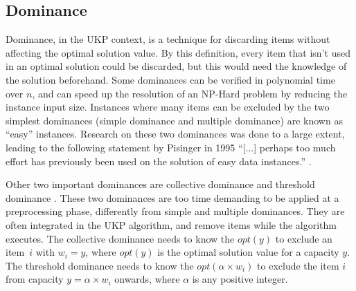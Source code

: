 \documentclass[runningheads,a4paper]{llncs}
\begin{document}

\subsection{Dominance}

Dominance, in the UKP context, is a technique for discarding items without affecting the optimal solution value. 
By this definition, every item that isn't used in an optimal solution could be discarded, but this would need the knowledge of the solution beforehand. 
Some dominances can be verified in polynomial time over \(n\), and can speed up the resolution of an NP-Hard problem by reducing the instance input size. 
Instances where many items can be excluded by the two simplest dominances (simple dominance and multiple dominance) are known as ``easy'' instances. 
Research on these two dominances was done to a large extent, leading to the following statement by Pisinger in 1995
``[...] perhaps too much effort has previously been used on the solution of easy data instances.'' \cite[p. 20]{pisinger1995}.

Other two important dominances are collective dominance and threshold dominance \cite{pya}. 
These two dominances are too time demanding to be applied at a preprocessing phase, differently from simple and multiple dominances. 
They are often integrated in the UKP algorithm, and remove items while the algorithm executes. 
The collective dominance needs to know the \(opt(y)\) to exclude an item~\(i\) with \(w_i = y\), where \(opt(y)\) is the optimal solution value for a capacity \(y\).
The threshold dominance needs to know the \(opt(\alpha\times w_i)\) to exclude the item \(i\) from capacity \(y = \alpha\times w_i\) onwards, where \(\alpha\) is any positive integer.

\end{document}
